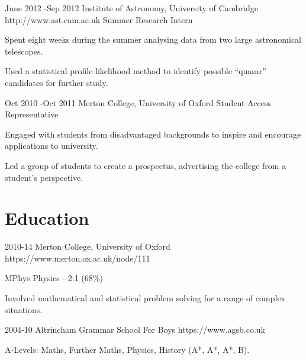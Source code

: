 \documentclass[10pt]{article} %
\begin{document}
\job
{June 2012 -}{Sep 2012}
{Institute of Astronomy, University of Cambridge}
{http://www.ast.cam.ac.uk}
{Summer Research Intern}
{\begin{itemize-noindent}
  \item{Spent eight weeks during the summer analysing data from two large astronomical telescopes.}
  \item{Used a statistical profile likelihood method to identify possible ``quasar'' candidates for further study.}
\end{itemize-noindent}}

\job
{Oct 2010 -}{Oct 2011}
{Merton College, University of Oxford}
{}
{Student Access Representative}
{\begin{itemize-noindent}
  \item{Engaged with students from disadvantaged backgrounds to inspire and encourage applications to university.}
  \item{Led a group of students to create a prospectus, advertising the college from a student's perspective.}
 \end{itemize-noindent}}


\section{Education}
\edu
{2010-14}
{Merton College, University of Oxford}
{https://www.merton.ox.ac.uk/node/111}
{
  \begin{itemize-noindent}
  \item{MPhys Physics - 2:1 (68\%)}
  \item{Involved mathematical and statistical problem solving for a range of complex situations.}
  \end{itemize-noindent}
}

\edu
{2004-10}
{Altrincham Grammar School For Boys}
{https://www.agsb.co.uk}
{
  \begin{itemize-noindent}
  \item{A-Levels: Maths, Further Maths, Physics, History (A*, A*, A*, B).}
  \end{itemize-noindent}
}

\end{document}
